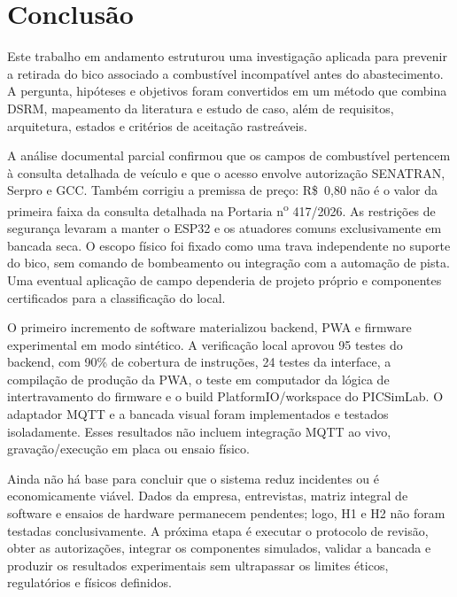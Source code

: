 \section{Conclusão}
\label{sec:conclusao}

Este trabalho em andamento estruturou uma investigação aplicada para prevenir a
retirada do bico associado a combustível incompatível antes do abastecimento. A pergunta,
hipóteses e objetivos foram convertidos em um método que combina DSRM,
mapeamento da literatura e estudo de caso, além de requisitos, arquitetura,
estados e critérios de aceitação rastreáveis.

A análise documental parcial confirmou que os campos de combustível pertencem à
consulta detalhada de veículo e que o acesso envolve autorização SENATRAN,
Serpro e GCC. Também corrigiu a premissa de preço: R\$~0{,}80 não é o valor da
primeira faixa da consulta detalhada na Portaria n\textsuperscript{o} 417/2026. As restrições de
segurança levaram a manter o ESP32 e os atuadores comuns exclusivamente em
bancada seca. O escopo físico foi fixado como uma trava independente no suporte
do bico, sem comando de bombeamento ou integração com a automação de pista. Uma
eventual aplicação de campo dependeria de projeto próprio e componentes
certificados para a classificação do local.

O primeiro incremento de software materializou backend, PWA e firmware
experimental em modo sintético. A verificação local aprovou 95 testes do
backend, com 90\% de cobertura de instruções, 24 testes da interface, a
compilação de produção da PWA, o teste em computador da lógica de
intertravamento do firmware e o build PlatformIO/workspace do PICSimLab. O
adaptador MQTT e a bancada visual foram implementados e testados isoladamente.
Esses resultados não incluem integração MQTT ao vivo, gravação/execução em placa
ou ensaio físico.

Ainda não há base para concluir que o sistema reduz incidentes ou é
economicamente viável. Dados da empresa, entrevistas, matriz integral de
software e ensaios de hardware permanecem pendentes; logo, H1 e H2 não foram
testadas conclusivamente. A próxima etapa é executar o protocolo de revisão,
obter as autorizações, integrar os componentes simulados, validar a bancada e
produzir os resultados experimentais sem ultrapassar os limites éticos,
regulatórios e físicos definidos.
